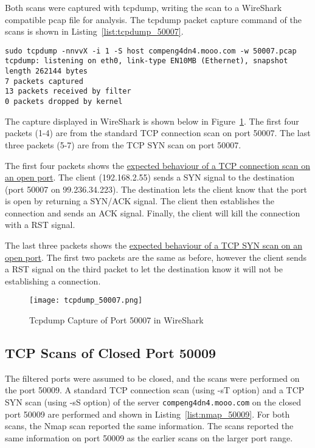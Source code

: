 Both scans were captured with tcpdump, writing the scan to a WireShark compatible pcap file for analysis. The tcpdump packet capture command of the scans is shown in Listing~\ref{list:tcpdump_50007}. 

\begin{lstlisting}[caption=Tcpdump Packet Capture of Scans on Port 50007,label=list:tcpdump_50007]
sudo tcpdump -nnvvX -i 1 -S host compeng4dn4.mooo.com -w 50007.pcap
tcpdump: listening on eth0, link-type EN10MB (Ethernet), snapshot length 262144 bytes
7 packets captured
13 packets received by filter
0 packets dropped by kernel
\end{lstlisting}

The capture displayed in WireShark is shown below in Figure~\ref{fig:wireshark_50007}. The first four packets (1-4) are from the standard TCP connection scan on port 50007. The last three packets (5-7) are from the TCP SYN scan on port 50007.

The first four packets shows the \href{https://nmap.org/book/scan-methods-connect-scan.html#scan-methods-fig-connect-scan-open}{expected behaviour of a TCP connection scan on an open port}. The client (192.168.2.55) sends a SYN signal to the destination (port 50007 on 99.236.34.223). The destination lets the client know that the port is open by returning a SYN/ACK signal. The client then establishes the connection and sends an ACK signal. Finally, the client will kill the connection with a RST signal.

The last three packets shows the \href{https://nmap.org/book/synscan.html#scan-methods-fig-syn-scan-open}{expected behaviour of a TCP SYN scan on an open port}. The first two packets are the same as before, however the client sends a RST signal on the third packet to let the destination know it will not be establishing a connection.

\begin{figure}[htp]
\centering
\caption[tcpdump_50007]{Tcpdump Capture of Port 50007 in WireShark}\label{fig:wireshark_50007}
\texttt{[image: tcpdump\_50007.png]}
\end{figure}


\subsection*{TCP Scans of Closed Port 50009}
The filtered ports were assumed to be closed, and the scans were performed on the port 50009. A standard TCP connection scan (using -sT option) and a TCP SYN scan (using -sS option) of the server \texttt{compeng4dn4.mooo.com} on the closed port 50009 are performed and shown in Listing~\ref{list:nmap_50009}. For both scans, the Nmap scan reported the same information. The scans reported the same information on port 50009 as the earlier scans on the larger port range.

